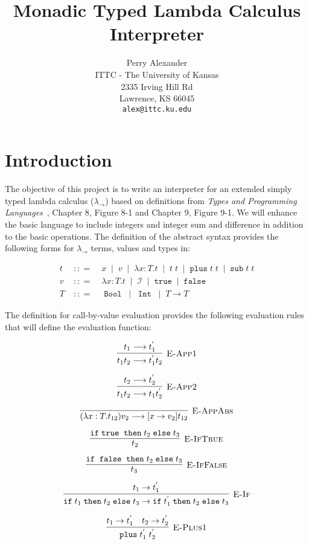 \documentclass[10pt]{article}
\title{Monadic Typed Lambda Calculus Interpreter}
\author{Perry Alexander \\
  ITTC - The University of Kansas \\
  2335 Irving Hill Rd \\
  Lawrence, KS 66045 \\
  \texttt{alex@ittc.ku.edu}}
\newcommand{\isa}{\ensuremath{\; {:}{:}{=} \;}}
\newcommand{\ora}{\ensuremath{\;\mid\;}}
\newcommand{\IF}{\ensuremath{\mathtt{ if \;}}}
\newcommand{\THEN}{\ensuremath{\mathtt{\; then \;}}}
\newcommand{\ELSE}{\ensuremath{\mathtt{\; else \;}}}
\newcommand{\TRUE}{\ensuremath{\mathtt{ true \;}}}
\newcommand{\FALSE}{\ensuremath{\mathtt{\; false \;}}}
\newcommand{\BOOL}{\ensuremath{\mathtt{\; Bool \;}}}
\newcommand{\INT}{\ensuremath{\mathtt{\; Int \;}}}
\newcommand{\PLUS}{\ensuremath{\mathtt{ plus \;}}}
\newcommand{\MINUS}{\ensuremath{\mathtt{ sub \;}}}
\begin{document}
\maketitle

\section{Introduction}

The objective of this project is to write an interpreter for an
extended simply typed lambda calculus ($\lambda_\rightarrow$) based on
definitions from \emph{Types and Programming Languages}~\cite{Pie02a},
Chapter 8, Figure 8-1 and Chapter 9, Figure 9-1.  We will enhance the
basic language to include integers and integer sum and difference in
addition to the basic operations.  The definition of the abstract
syntax provides the following forms for $\lambda_\rightarrow$ terms,
values and types in:

\begin{eqnarray*}
  t & \isa & x \ora v \ora \lambda x:T.t \ora t\; t \ora \PLUS t\; t \ora \MINUS t\;
  t \\
  v & \isa & \lambda x:T.t \ora \mathcal{I} \ora \mathtt{true} \ora \mathtt{false}\\
  T & \isa & \BOOL \ora \INT \ora T \rightarrow T
\end{eqnarray*}

The definition for call-by-value evaluation provides the following
evaluation rules that will define the evaluation function:

\[\vcenter{\infer[\textsc{E-App1}]
  {t_1 t_2 \longrightarrow t_1^{'} t_2}
  {t_1\longrightarrow t_1^{'}}}\]

\[\vcenter{\infer[\textsc{E-App2}]
  {t_1 t_2 \longrightarrow t_1 t_2^{'}}
  {t_2\longrightarrow t_2^{'}}}\]

\[\vcenter{\infer[\textsc{E-AppAbs}]
  {(\lambda x:T.t_{12})v_2 \longrightarrow [x\rightarrow v_2]t_{12}}
  {}}\]

\[\vcenter{\infer[\textsc{E-IfTrue}]
  {t_2}
  {\IF \TRUE \THEN t_2 \ELSE t_3}}\]

\[\vcenter{\infer[\textsc{E-IfFalse}]
  {t_3}
  {\IF \FALSE \THEN t_2 \ELSE t_3}}\]

\[\vcenter{\infer[\textsc{E-If}]
  {\IF t_1 \THEN t_2 \ELSE t_3 \rightarrow \IF t_1^{'} \THEN t_2 \ELSE t_3}
  {t_1\rightarrow t_1^{'}}}
\]

\[\vcenter{\infer[\textsc{E-Plus1}]
  {\PLUS t_1^{'}\; t_2^{'}}
  {t_1\rightarrow t_1^{'} & t_2\rightarrow t_2^{'}}}
\]
\end{document}
